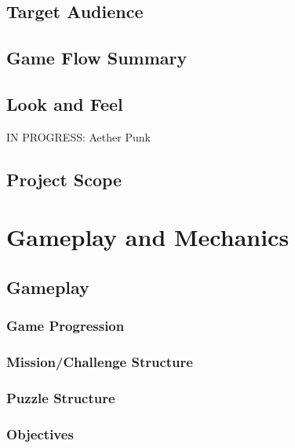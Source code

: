 \documentclass[12pt,titlepage]{article}
\begin{document}
\subsection{Target Audience}

\subsection{Game Flow Summary}

\subsection{Look and Feel}
IN PROGRESS: Aether Punk

\subsection{Project Scope}
%

\newpage
\section{Gameplay and Mechanics}

\subsection{Gameplay}

\subsubsection{Game Progression}

\subsubsection{Mission/Challenge Structure}

\subsubsection{Puzzle Structure}

\subsubsection{Objectives}
\end{document}
